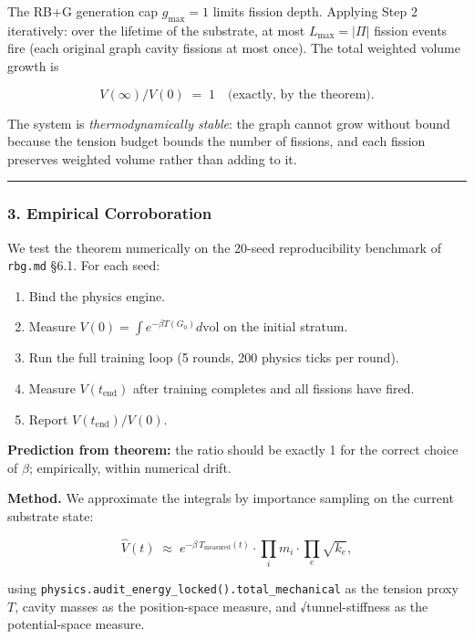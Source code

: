 \documentclass[
  11pt,
  a4paper,
]{article}
\providecommand{\tightlist}{%
  \setlength{\itemsep}{0pt}\setlength{\parskip}{0pt}}
\begin{document}
The RB+G generation cap \(g_\text{max} = 1\) limits fission depth.
Applying Step 2 iteratively: over the lifetime of the substrate, at most
\(L_\text{max} = |\Pi|\) fission events fire (each original graph cavity
fissions at most once). The total weighted volume growth is

\[
V(\infty) / V(0) \;=\; 1 \quad \text{(exactly, by the theorem)}.
\]

The system is \emph{thermodynamically stable}: the graph cannot grow
without bound because the tension budget bounds the number of fissions,
and each fission preserves weighted volume rather than adding to it.

\begin{center}\rule{0.5\linewidth}{0.5pt}\end{center}

\subsubsection{3. Empirical
Corroboration}\label{empirical-corroboration}

We test the theorem numerically on the 20-seed reproducibility benchmark
of \texttt{rbg.md} §6.1. For each seed:

\begin{enumerate}
\def\labelenumi{\arabic{enumi}.}
\tightlist
\item
  Bind the physics engine.
\item
  Measure \(V(0) = \int e^{-\beta T(G_0)} d\text{vol}\) on the initial
  stratum.
\item
  Run the full training loop (5 rounds, 200 physics ticks per round).
\item
  Measure \(V(t_{\text{end}})\) after training completes and all
  fissions have fired.
\item
  Report \(V(t_\text{end}) / V(0)\).
\end{enumerate}

\textbf{Prediction from theorem:} the ratio should be exactly 1 for the
correct choice of \(\beta\); empirically, within numerical drift.

\textbf{Method.} We approximate the integrals by importance sampling on
the current substrate state:

\[
\hat{V}(t) \;\approx\; e^{-\beta \, T_\text{measured}(t)} \cdot \prod_i m_i \cdot \prod_e \sqrt{k_e},
\]

using \texttt{physics.audit\_energy\_locked().total\_mechanical} as the
tension proxy \(T\), cavity masses as the position-space measure, and
√tunnel-stiffness as the potential-space measure.
\end{document}
